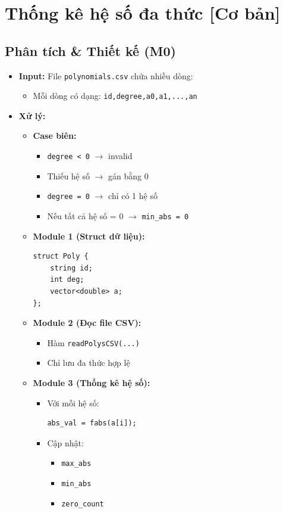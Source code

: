 \section{Thống kê hệ số đa thức [Cơ bản]}
\subsection{Phân tích \& Thiết kế (M0)}
\begin{itemize}
    \item \textbf{Input:}
    File \texttt{polynomials.csv} chứa nhiều dòng:
    \begin{itemize}
        \item Mỗi dòng có dạng:
        \texttt{id,degree,a0,a1,...,an}
    \end{itemize}

    \item \textbf{Xử lý:}
    \begin{itemize}
        \item \textbf{Case biên:}
        \begin{itemize}
            \item \texttt{degree < 0} $\rightarrow$ invalid
            \item Thiếu hệ số $\rightarrow$ gán bằng 0
            \item \texttt{degree = 0} $\rightarrow$ chỉ có 1 hệ số
            \item Nếu tất cả hệ số = 0 $\rightarrow$ \texttt{min\_abs = 0}
        \end{itemize}

        \item \textbf{Module 1 (Struct dữ liệu):}
\begin{lstlisting}
struct Poly {
    string id;
    int deg;
    vector<double> a;
};
\end{lstlisting}

        \item \textbf{Module 2 (Đọc file CSV):}
        \begin{itemize}
            \item Hàm \texttt{readPolysCSV(...)}
            \item Chỉ lưu đa thức hợp lệ
        \end{itemize}

        \item \textbf{Module 3 (Thống kê hệ số):}
        \begin{itemize}
            \item Với mỗi hệ số:
\begin{lstlisting}
abs_val = fabs(a[i]);
\end{lstlisting}
            \item Cập nhật:
            \begin{itemize}
                \item \texttt{max\_abs}
                \item \texttt{min\_abs}
                \item \texttt{zero\_count}
            \end{itemize}
        \end{itemize}


\end{itemize}
\end{itemize}
